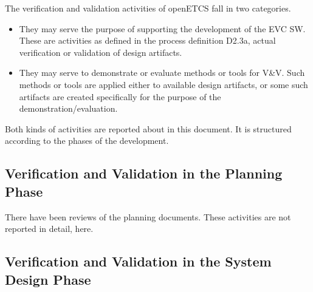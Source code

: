 \documentclass{template/openetcs_article}
\begin{document}
The verification and validation activities of openETCS fall in two
categories. 
\begin{itemize}
\item They may serve the purpose of supporting the development
of the EVC SW. These are activities as defined in the process
definition D2.3a, actual verification or validation of design
artifacts.
\item They may serve to demonstrate or evaluate methods or tools for
  V\&V. Such methods or tools are applied either to available design
  artifacts, or some such artifacts are created specifically for the
  purpose of the demonstration/evaluation.
\end{itemize}
Both kinds of activities are reported about in this document. It is
structured according to the phases of the development. 




\addtocounter{subsection}{-1}
\subsection{Verification and Validation in the Planning Phase}
\label{sec:vnv-0}

There have been reviews of the planning documents. These activities
are not reported in detail, here.

% 

\subsection{Verification and Validation in the System Design Phase}
\label{sec:vnv-1}



\newpage

\newpage

\end{document}
